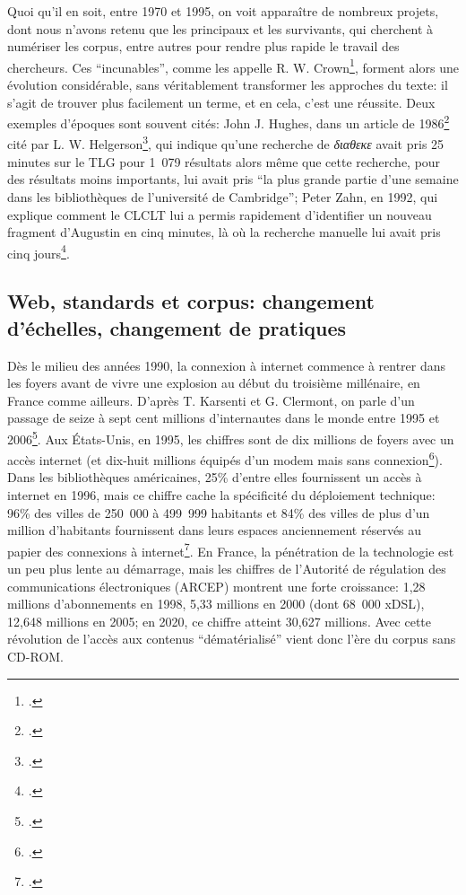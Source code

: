 Quoi qu'il en soit, entre 1970 et 1995, on voit apparaître de nombreux projets, dont nous n'avons retenu que les principaux et les survivants, qui cherchent à numériser les corpus, entre autres pour rendre plus rapide le travail des chercheurs. Ces \enquote{incunables}, comme les appelle R. W. Crown\footcite[p.~107]{crown_comparing_2000}, forment alors une évolution considérable, sans véritablement transformer les approches du texte: il s'agit de trouver plus facilement un terme, et en cela, c'est une réussite. Deux exemples d'époques sont souvent cités: John J. Hughes, dans un article de 1986\footcite{hughes_ibycus_1986} cité par L. W. Helgerson\footcite{helgerson_cd-rom_1988}, qui indique qu'une recherche de \textit{\textgreek{διαθεκε}} avait pris 25 minutes sur le TLG pour 1~079 résultats alors même que cette recherche, pour des résultats moins importants, lui avait pris \enquote{la plus grande partie d'une semaine dans les bibliothèques de l'université de Cambridge}; Peter Zahn, en 1992, qui explique comment le CLCLT lui a permis rapidement d'identifier un nouveau fragment d'Augustin en cinq minutes, là où la recherche manuelle lui avait pris cinq jours\footcite[p. 427]{zahn_kirchenvater-texte_1992}.

\subsection{Web, standards et corpus: changement d'échelles, changement de pratiques}

Dès le milieu des années 1990, la connexion à internet commence à rentrer dans les foyers avant de vivre une explosion au début du troisième millénaire, en France comme ailleurs. D'après T. Karsenti et G. Clermont, on parle d'un passage de seize à sept cent millions d'internautes dans le monde entre 1995 et 2006\footcite{karsenti_les_2006}. Aux États-Unis, en 1995, les chiffres sont de dix millions de foyers avec un accès internet (et dix-huit millions équipés d'un modem mais sans connexion\footcite{nw_americans_1995}). Dans les bibliothèques américaines, 25\% d'entre elles fournissent un accès à internet en 1996, mais ce chiffre cache la spécificité du déploiement technique: 96\% des villes de 250~000 à 499~999 habitants et 84\% des villes de plus d'un million d'habitants fournissent dans leurs espaces anciennement réservés au papier des connexions à internet\footcite{zumalt_internet_1998}. En France, la pénétration de la technologie est un peu plus lente au démarrage, mais les chiffres de l'Autorité de régulation des communications électroniques (ARCEP) montrent une forte croissance: 1,28 millions d'abonnements en 1998, 5,33 millions en 2000 (dont 68~000 xDSL), 12,648 millions en 2005; en 2020, ce chiffre atteint 30,627 millions. Avec cette révolution de l'accès aux contenus \enquote{dématérialisé} vient donc l'ère du corpus sans CD-ROM.

